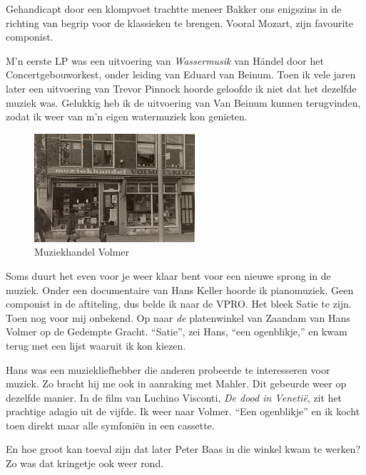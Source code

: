 \documentclass[12pt,twoside, openright]{memoir}
\begin{document}
Gehandicapt door een klompvoet trachtte meneer Bakker ons enigszins in de richting van begrip voor de klassieken te brengen. Vooral Mozart, zijn favourite componist.

M’n eerste LP was een uitvoering van \emph{Wassermusik} van Händel door het Concertgebouworkest, onder leiding van Eduard van Beinum. Toen ik vele jaren later een uitvoering van Trevor Pinnock hoorde geloofde ik niet dat het dezelfde muziek was. Gelukkig heb ik de uitvoering van Van Beinum kunnen terugvinden, zodat ik weer van m’n eigen watermuziek kon genieten. 

\begin{figure}
\includegraphics[width=\textwidth]{img/ch16/volmer}
\caption*{\footnotesize Muziekhandel Volmer}
\end{figure}

Soms duurt het even voor je weer klaar bent voor een nieuwe sprong in de muziek. Onder een documentaire van Hans Keller hoorde ik pianomuziek. Geen componist in de aftiteling, dus belde ik naar de VPRO. Het bleek Satie te zijn. Toen nog voor mij onbekend. Op naar \emph{de} platenwinkel van Zaandam van Hans Volmer op de Gedempte Gracht. ``Satie'', zei Hans, ``een ogenblikje,'' en kwam terug met een lijst waaruit ik kon kiezen. 

Hans was een muziekliefhebber die anderen probeerde te interesseren voor muziek. Zo bracht hij me ook in aanraking met Mahler. Dit gebeurde weer op dezelfde manier. In de film van Luchino Visconti, \emph{De dood in Venetië}, zit het prachtige adagio uit de vijfde. Ik weer naar Volmer. ``Een ogenblikje'' en ik kocht toen direkt maar alle symfoniën in een cassette.

En hoe groot kan toeval zijn dat later Peter Baas in die winkel kwam te werken? Zo was dat kringetje ook weer rond. 
\end{document}
